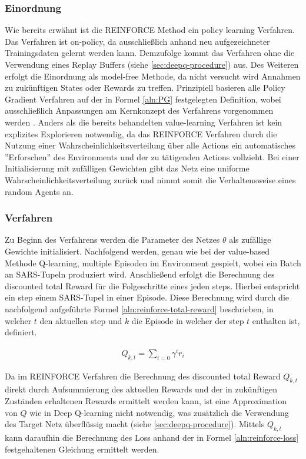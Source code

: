 \documentclass[11pt]{scrartcl}
\begin{document}
\subsubsection{Einordnung}
Wie bereits erwähnt ist die REINFORCE Method ein policy learning Verfahren. Das Verfahren ist
on-policy, da ausschließlich anhand neu aufgezeichneter Trainingsdaten gelernt werden kann.
Demzufolge kommt das Verfahren ohne die Verwendung eines Replay Buffers (siehe 
\autoref{sec:deepq-procedure}) aus. Des Weiteren erfolgt die Einordnung als model-free Methode,
da nicht versucht wird Annahmen zu zukünftigen States oder Rewards zu treffen. Prinzipiell
basieren alle Policy Gradient Verfahren auf der in Formel \ref{aln:PG} festgelegten Definition,
wobei ausschließlich Anpassungen am Kernkonzept des Verfahrens vorgenommen werden
\cite[~S.244 f.]{L2018}. Anders als die bereits behandelten value-learning Verfahren ist
kein explizites Explorieren notwendig, da das REINFORCE Verfahren durch die Nutzung einer
Wahrscheinlichkeitsverteilung über alle Actions ein automatisches ''Erforschen'' 
des Environments und der zu tätigenden Actions vollzieht. Bei einer Initialisierung mit
zufälligen Gewichten gibt das Netz eine uniforme Wahrscheinlichkeitsverteilung zurück und nimmt
somit die Verhaltensweise eines random Agents an.


\subsubsection{Verfahren}
Zu Beginn des Verfahrens werden die Parameter des Netzes $\theta$ als zufällige Gewichte
initialisiert. Nachfolgend werden, genau wie bei der value-based Methode Q-learning,
multiple Episoden im Environment gespielt, wobei ein Batch an SARS-Tupeln produziert wird.
Anschließend erfolgt die Berechnung des discounted total Reward für die Folgeschritte eines
jeden steps. Hierbei entspricht ein step einem SARS-Tupel in einer Episode. Diese Berechnung
wird durch die nachfolgend aufgeführte Formel \ref{aln:reinforce-total-reward} beschrieben,
in welcher $t$ den aktuellen step und $k$ die Episode in welcher der step $t$ enthalten
ist, definiert. 

\begin{align}
Q_{k,t}=\sum_{i=0} \gamma^{i}r_{i}
\label{aln:reinforce-total-reward}
\end{align}

Da im REINFORCE Verfahren die Berechnung des discounted total Reward $Q_{k,t}$ direkt durch
Aufsummierung des aktuellen Rewards und der in zukünftigen Zuständen erhaltenen Rewards
ermittelt werden kann, ist eine Approximation von $Q$ wie in Deep Q-learning nicht notwendig,
was zusätzlich die Verwendung des Target Netz überflüssig macht (siehe 
\autoref{sec:deepq-procedure}). Mittels $Q_{k,t}$ kann daraufhin die Berechnung des Loss
anhand der in Formel \ref{aln:reinforce-loss} festgehaltenen Gleichung ermittelt werden.
\end{document}
